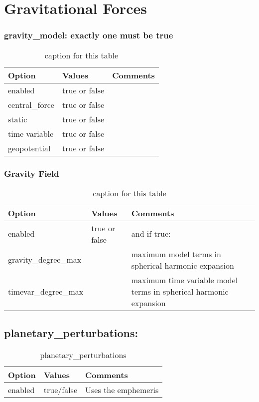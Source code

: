 \section{Gravitational Forces}
%
\subsubsection{gravity\_model: exactly one must be true}
\begin{table}[h!]
	\begin{tabular}{|p{2.5cm}|p{2.5cm}|p{5cm}|}
		\hline
		Option & Values & Comments \\
		\hline
		enabled & true or false & \\
		central\_force & true or false &  \\ 
		static & true or false &  \\
		time variable & true or false &  \\
		geopotential & true or false &  \\
		\hline
	\end{tabular}
	\caption{caption for this table}
	\label{table:label_name}
\end{table}
%

\subsubsection{Gravity Field}
\begin{table}[h!]
	\begin{tabular}{|p{2.5cm}|p{2.5cm}|p{5cm}|}
		\hline
		Option & Values & Comments \\
		\hline
        enabled & true or false & and if true:\\
        gravity\_degree\_max &  & maximum model terms in spherical harmonic expansion \\ 
        timevar\_degree\_max &  & maximum time variable model terms in spherical harmonic expansion \\
        \hline
	\end{tabular}
	\caption{caption for this table}
	\label{table:label_name}
\end{table}
%
\subsection{planetary\_perturbations:}
\begin{table}[h!]
	\begin{tabular}{|p{2.5cm}|p{2.5cm}|p{5cm}|}
		\hline
		Option & Values & Comments \\
		\hline
	    enabled & true/false & Uses the emphemeris \\ %
		\hline
	\end{tabular}
	\caption{planetary\_perturbations}
	\label{table:label_name}
\end{table}  
%
